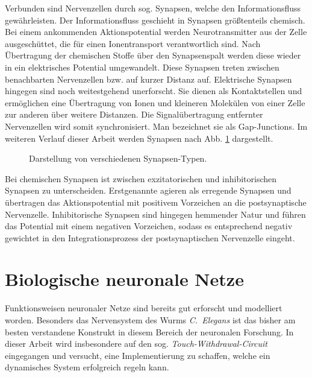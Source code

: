 	Verbunden sind Nervenzellen durch sog. Synapsen, welche den Informationsfluss gewährleisten. Der Informationsfluss geschieht in Synapsen größtenteils chemisch. Bei einem ankommenden Aktionspotential werden Neurotransmitter aus der Zelle ausgeschüttet, die für einen Ionentransport verantwortlich sind. Nach Übertragung der chemischen Stoffe über den Synapsenspalt werden diese wieder in ein elektrisches Potential umgewandelt. Diese Synapsen treten zwischen benachbarten Nervenzellen bzw. auf kurzer Distanz auf. Elektrische Synapsen hingegen sind noch weitestgehend unerforscht. Sie dienen als Kontaktstellen und ermöglichen eine Übertragung von Ionen und kleineren Molekülen von einer Zelle zur anderen über weitere Distanzen. Die Signalübertragung entfernter Nervenzellen wird somit synchronisiert. Man bezeichnet sie als \glqq Gap-Junctions\grqq. Im weiteren Verlauf dieser Arbeit werden Synapsen nach Abb. \ref{fig:synapse} dargestellt.
	\begin{figure}[H] %
		\centering
		\def\svgwidth{12cm}
		
		\caption{Darstellung von verschiedenen Synapsen-Typen.}
		\label{fig:synapse}
	\end{figure}
	Bei chemischen Synapsen ist zwischen exzitatorischen und inhibitorischen Synapsen zu unterscheiden. Erstgenannte agieren als erregende Synapsen und übertragen das Aktionspotential mit positivem Vorzeichen an die postsynaptische Nervenzelle. Inhibitorische Synapsen sind hingegen hemmender Natur und führen das Potential mit einem negativen Vorzeichen, sodass es entsprechend negativ gewichtet in den Integrationsprozess der postsynaptischen Nervenzelle eingeht.
\section{Biologische neuronale Netze}
\label{sec:neuro_netz}
	Funktionsweisen neuronaler Netze sind bereits gut erforscht und modelliert worden. Besonders das Nervensystem des Wurms \textit{C.~Elegans} \cite{CElegans} ist das bisher am besten verstandene Konstrukt in diesem Bereich der neuronalen Forschung. In dieser Arbeit wird insbesondere auf den sog. \textit{Touch-Withdrawal-Circuit} eingegangen und versucht, eine Implementierung zu schaffen, welche ein dynamisches System erfolgreich regeln kann.
	
